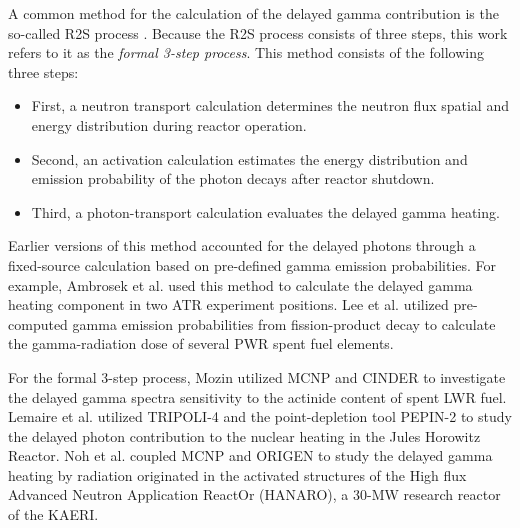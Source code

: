 \documentclass{style/nseJournal}
\begin{document}
A common method for the calculation of the delayed gamma contribution is the so-called \gls*{R2S} process \cite{chen_rigorous_2002}.
Because the \gls*{R2S} process consists of three steps, this work refers to it as the \textit{formal 3-step process}.
This method consists of the following three steps:
\begin{itemize}
  \item First, a neutron transport calculation determines the neutron flux spatial and energy distribution during reactor operation.
  \item Second, an activation calculation estimates the energy distribution and emission probability of the photon decays after reactor shutdown.
  \item Third, a photon-transport calculation evaluates the delayed gamma heating.
\end{itemize}

Earlier versions of this method accounted for the delayed photons through a fixed-source calculation based on pre-defined gamma emission probabilities.
For example, Ambrosek et al. \cite{ambrosek_improved_1995} used this method to calculate the delayed gamma heating component in two \gls*{ATR} experiment positions.
Lee et al. \cite{lee_tripoli_2013} utilized pre-computed gamma emission probabilities from fission-product decay to calculate the gamma-radiation dose of several \gls*{PWR} spent fuel elements.

For the formal 3-step process, Mozin \cite{mozin_delayed_2011} utilized MCNP \cite{mcnp} and CINDER \cite{mcnp-cinder} to investigate the delayed gamma spectra sensitivity to the actinide content of spent LWR fuel.
Lemaire et al. \cite{lemaire_estimation_2015} utilized TRIPOLI-4 \cite{tripoli4} and the point-depletion tool PEPIN-2 \cite{pepin2} to study the delayed photon contribution to the nuclear heating in the Jules Horowitz Reactor.
Noh et al. \cite{noh_estimation_2018} coupled MCNP and ORIGEN to study the delayed gamma heating by radiation originated in the activated structures of the High flux Advanced Neutron Application ReactOr (HANARO), a 30-MW research reactor of the \gls*{KAERI}.
\end{document}
